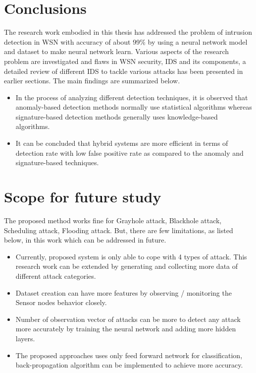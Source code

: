 \section{Conclusions}
The research work embodied in this thesis has addressed the problem of intrusion detection in WSN with accuracy of about 99\% by using a neural network model and dataset to make neural network learn. Various aspects of the research problem are investigated and flaws in WSN security, IDS and its components, a detailed review of different IDS to tackle various attacks has been presented in earlier sections. The main findings are summarized below.
\begin{itemize}
	\item In the process of analyzing different detection techniques, it is observed that anomaly-based detection methods normally use statistical algorithms whereas signature-based detection methods generally uses knowledge-based algorithms.
	\item It can be concluded that hybrid systems are more efficient in terms of detection rate with low false positive rate as compared to the anomaly and signature-based techniques.
\end{itemize}
\section{Scope for future study}
The proposed method works fine for Grayhole attack, Blackhole attack, Scheduling attack, Flooding attack. But, there are few limitations, as listed below, in this work which can be addressed in future.
\begin{itemize}
	\item Currently, proposed system is only able to cope with 4 types of attack. This research work can be extended by generating and collecting more data of different attack categories.
	\item Dataset creation can have more features by observing / monitoring the Sensor nodes behavior closely.
	\item Number of observation vector of attacks can be more to detect any attack more accurately by training the neural network and adding more hidden layers.
	\item The proposed approaches uses only feed forward network for classification, back-propagation algorithm can be implemented to achieve more accuracy.
	
\end{itemize}



